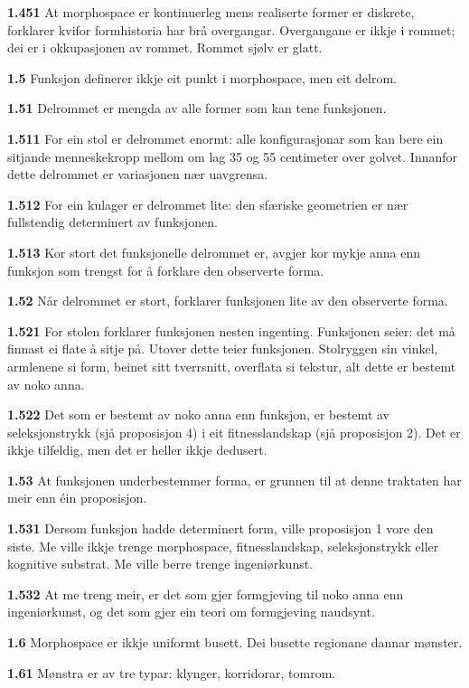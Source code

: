 \documentclass[11pt, a4paper]{article}
\newcommand{\subprop}[1]{\medskip\noindent\textbf{#1}\quad}
\begin{document}
\subprop{1.451} At morphospace er kontinuerleg mens realiserte former er diskrete, forklarer kvifor formhistoria har br\aa{} overgangar. Overgangane er ikkje i rommet; dei er i okkupasjonen av rommet. Rommet sj\o lv er glatt.

\subprop{1.5} Funksjon definerer ikkje eit punkt i morphospace, men eit delrom.

\subprop{1.51} Delrommet er mengda av alle former som kan tene funksjonen.

\subprop{1.511} For ein stol er delrommet enormt: alle konfigurasjonar som kan bere ein sitjande menneskekropp mellom om lag 35 og 55 centimeter over golvet. Innanfor dette delrommet er variasjonen n\ae r uavgrensa.

\subprop{1.512} For ein kulager er delrommet lite: den sf\ae riske geometrien er n\ae r fullstendig determinert av funksjonen.

\subprop{1.513} Kor stort det funksjonelle delrommet er, avgjer kor mykje anna enn funksjon som trengst for \aa{} forklare den observerte forma.

\subprop{1.52} N\aa r delrommet er stort, forklarer funksjonen lite av den observerte forma.

\subprop{1.521} For stolen forklarer funksjonen nesten ingenting. Funksjonen seier: det m\aa{} finnast ei flate \aa{} sitje p\aa. Utover dette teier funksjonen. Stolryggen sin vinkel, armlenene si form, beinet sitt tverrsnitt, overflata si tekstur, alt dette er bestemt av noko anna.

\subprop{1.522} Det som er bestemt av noko anna enn funksjon, er bestemt av seleksjonstrykk (sj\aa{} proposisjon 4) i eit fitnesslandskap (sj\aa{} proposisjon 2). Det er ikkje tilfeldig, men det er heller ikkje dedusert.

\subprop{1.53} At funksjonen underbestemmer forma, er grunnen til at denne traktaten har meir enn \'ein proposisjon.

\subprop{1.531} Dersom funksjon hadde determinert form, ville proposisjon 1 vore den siste. Me ville ikkje trenge morphospace, fitnesslandskap, seleksjonstrykk eller kognitive substrat. Me ville berre trenge ingeni\o rkunst.

\subprop{1.532} At me treng meir, er det som gjer formgjeving til noko anna enn ingeni\o rkunst, og det som gjer ein teori om formgjeving naudsynt.

\subprop{1.6} Morphospace er ikkje uniformt busett. Dei busette regionane dannar m\o nster.

\subprop{1.61} M\o nstra er av tre typar: klynger, korridorar, tomrom.
\end{document}
